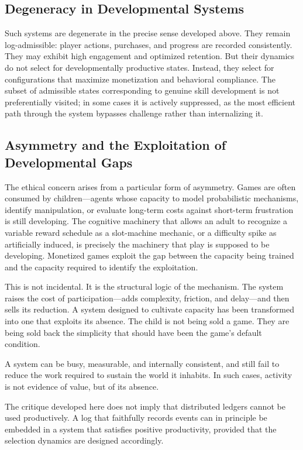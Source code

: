\documentclass[12pt, oneside]{article}
\theoremstyle{definition}
\begin{document}
\subsection{Degeneracy in Developmental Systems}

Such systems are degenerate in the precise sense developed above. They remain log-admissible: player actions, purchases, and progress are recorded consistently. They may exhibit high engagement and optimized retention. But their dynamics do not select for developmentally productive states. Instead, they select for configurations that maximize monetization and behavioral compliance. The subset of admissible states corresponding to genuine skill development is not preferentially visited; in some cases it is actively suppressed, as the most efficient path through the system bypasses challenge rather than internalizing it.

\subsection{Asymmetry and the Exploitation of Developmental Gaps}

The ethical concern arises from a particular form of asymmetry. Games are often consumed by children---agents whose capacity to model probabilistic mechanisms, identify manipulation, or evaluate long-term costs against short-term frustration is still developing. The cognitive machinery that allows an adult to recognize a variable reward schedule as a slot-machine mechanic, or a difficulty spike as artificially induced, is precisely the machinery that play is supposed to be developing. Monetized games exploit the gap between the capacity being trained and the capacity required to identify the exploitation.

This is not incidental. It is the structural logic of the mechanism. The system raises the cost of participation---adds complexity, friction, and delay---and then sells its reduction. A system designed to cultivate capacity has been transformed into one that exploits its absence. The child is not being sold a game. They are being sold back the simplicity that should have been the game's default condition.

A system can be busy, measurable, and internally consistent, and still fail to reduce the work required to sustain the world it inhabits. In such cases, activity is not evidence of value, but of its absence.



The critique developed here does not imply that distributed ledgers cannot be used productively. A log that faithfully records events can in principle be embedded in a system that satisfies positive productivity, provided that the selection dynamics are designed accordingly.
\end{document}
